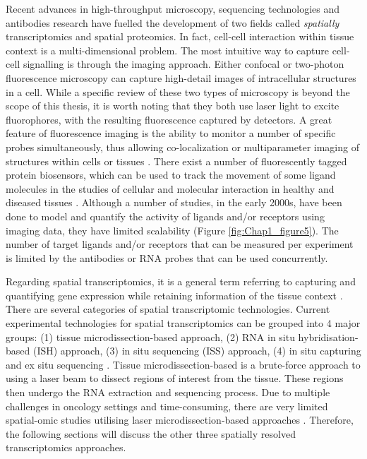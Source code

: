 Recent advances in high-throughput microscopy, sequencing technologies and antibodies research have fuelled the development of two fields called \textit{spatially} transcriptomics and spatial proteomics. In fact, cell-cell interaction within tissue context is a multi-dimensional problem. The most intuitive way to capture cell-cell signalling is through the imaging approach. Either confocal or two-photon fluorescence microscopy can capture high-detail images of intracellular structures in a cell. While a specific review of these two types of microscopy is beyond the scope of this thesis, it is worth noting that they both use laser light to excite fluorophores, with the resulting fluorescence captured by detectors. A great feature of fluorescence imaging is the ability to monitor a number of specific probes simultaneously, thus allowing co-localization or multiparameter imaging of structures within cells or tissues \cite{periasamy2013methods}. There exist a number of fluorescently tagged protein biosensors, which can be used to track the movement of some ligand molecules in the studies of cellular and molecular interaction in healthy and diseased tissues \cite{gerdes2013cell}. Although a number of studies, in the early 2000s, have been done to model and quantify the activity of ligands and/or receptors \cite{awaji1998real, go1997quantitative, maamra1999studies, sneddon2003activation, bohme2009illuminating} using imaging data, they have limited scalability (Figure \ref{fig:Chap1_figure5}). The number of target ligands and/or receptors that can be measured per experiment is limited by the antibodies or RNA probes that can be used concurrently.    

Regarding spatial transcriptomics, it is a general term referring to capturing and quantifying gene expression while retaining information of the tissue context \cite{burgess2019spatial}. There are several categories of spatial transcriptomic technologies. Current experimental technologies for spatial transcriptomics can be grouped into 4 major groups: (1) tissue microdissection-based approach, (2) RNA in situ hybridisation-based (ISH) approach, (3) in situ sequencing (ISS) approach, (4) in situ capturing and ex situ sequencing \cite{williams2022introduction}. Tissue microdissection-based is a brute-force approach to using a laser beam to dissect regions of interest from the tissue. These regions then undergo the RNA extraction and sequencing process. Due to multiple challenges in oncology settings and time-consuming, there are very limited spatial-omic studies utilising laser microdissection-based approaches \cite{wu2022spatial, wu2016spatially, junker2014genome}. Therefore, the following sections will discuss the other three spatially resolved transcriptomics approaches.
